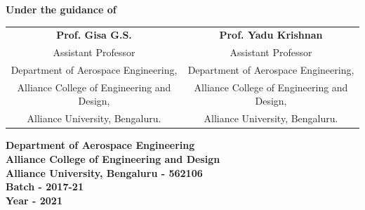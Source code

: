 \begin{titlepage}
\begin{center}
\textbf{Under the guidance of}\\
\begin{tabular}{cc}
\textbf{Prof. Gisa G.S.} & \textbf{Prof. Yadu Krishnan} \\
Assistant Professor & Assistant Professor \\
Department of Aerospace Engineering,& Department of Aerospace Engineering,\\
Alliance College of Engineering and Design, & Alliance College of Engineering and Design,\\
Alliance University, Bengaluru. & Alliance University, Bengaluru. \vspace*{1em}\\
\end{tabular}
\textbf{Department of Aerospace Engineering}\\
\textbf{Alliance College of Engineering and Design}\\
\textbf{Alliance University, Bengaluru - 562106} \\
\textbf{Batch - 2017-21}\\
\textbf{Year - 2021}
\end{center}
\end{titlepage}